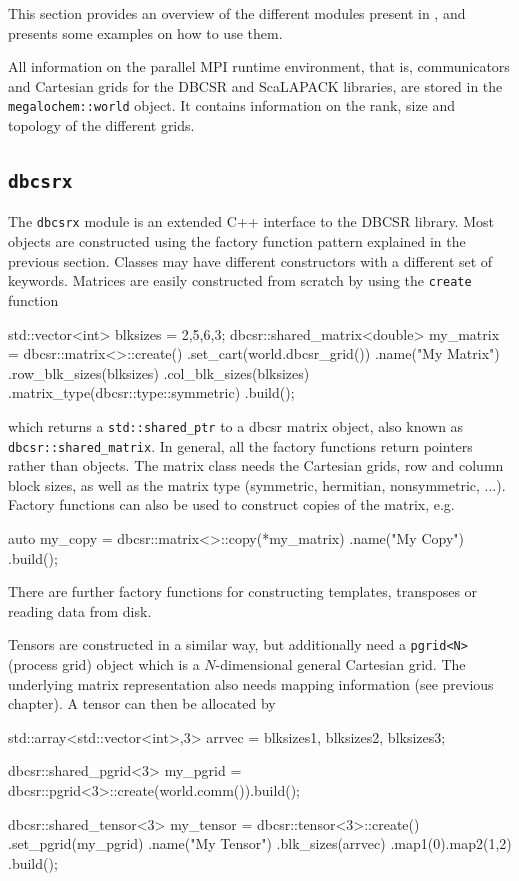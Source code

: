 This section provides an overview of the different modules present in \mchem{}, and presents some examples on how to use them. 

All information on the parallel MPI runtime environment, that is, communicators and Cartesian grids for the DBCSR and ScaLAPACK libraries, are stored in the \texttt{megalochem::world} object. It contains information on the rank, size and topology of the different grids. 

\subsection{\texttt{dbcsrx}}

The \texttt{dbcsrx} module is an extended C++ interface to the DBCSR library. Most objects are constructed using the factory function pattern explained in the previous section. Classes may have different constructors with a different set of keywords. Matrices are easily constructed from scratch by using the \texttt{create} function
\begin{cppinline}
std::vector<int> blksizes = {2,5,6,3};
dbcsr::shared_matrix<double> 
my_matrix = dbcsr::matrix<>::create()
	.set_cart(world.dbcsr_grid())
	.name("My Matrix")
	.row_blk_sizes(blksizes)
	.col_blk_sizes(blksizes)
	.matrix_type(dbcsr::type::symmetric)
	.build();
\end{cppinline}
\noindent which returns a \texttt{std::shared\_ptr} to a dbcsr matrix object, also known as \texttt{dbcsr::shared\_matrix}. In general, all the factory functions return pointers rather than objects. The matrix class needs the Cartesian grids, row and column block sizes, as well as the matrix type (symmetric, hermitian, nonsymmetric, ...). Factory functions can also be used to construct copies of the matrix, e.g.
\begin{cppinline}
auto my_copy = dbcsr::matrix<>::copy(*my_matrix)
	.name("My Copy")
	.build();
\end{cppinline}
\noindent There are further factory functions for constructing templates, transposes or reading data from disk.

Tensors are constructed in a similar way, but additionally need a \texttt{pgrid<N>} (process grid) object which is a $N$-dimensional general Cartesian grid. The underlying matrix representation also needs mapping information (see previous chapter). A tensor can then be allocated by
\begin{cppinline}
std::array<std::vector<int>,3> 
arrvec = {blksizes1, blksizes2, blksizes3};

dbcsr::shared_pgrid<3> 
my_pgrid = dbcsr::pgrid<3>::create(world.comm()).build();

dbcsr::shared_tensor<3>
my_tensor = dbcsr::tensor<3>::create()
	.set_pgrid(my_pgrid)
	.name("My Tensor")	
	.blk_sizes(arrvec)
	.map1({0}).map2({1,2})
	.build();
\end{cppinline} 


